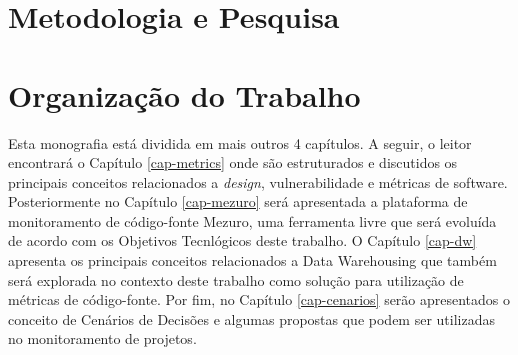 





\section{Metodologia e Pesquisa}


\section{Organização do Trabalho}

Esta monografia está dividida em mais outros 4 capítulos. A seguir, o leitor encontrará o Capítulo \ref{cap-metrics} onde são estruturados e discutidos os principais conceitos relacionados a \emph{design}, vulnerabilidade e métricas de software. Posteriormente no Capítulo \ref{cap-mezuro} será apresentada a plataforma de monitoramento de código-fonte Mezuro, uma ferramenta livre que será evoluída de acordo com os Objetivos Tecnlógicos deste trabalho. O Capítulo \ref{cap-dw} apresenta os principais conceitos relacionados a Data Warehousing que também será explorada no contexto deste trabalho como solução para utilização de métricas de código-fonte. Por fim, no Capítulo \ref{cap-cenarios} serão apresentados o conceito de Cenários de Decisões e algumas propostas que podem ser utilizadas no monitoramento de projetos.